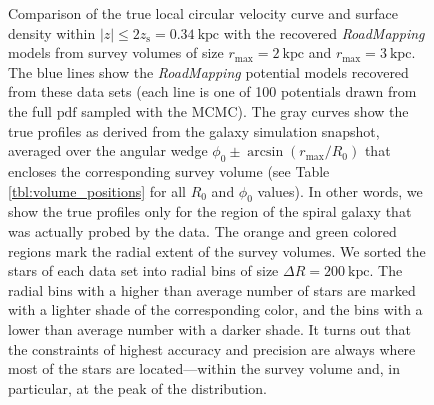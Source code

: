 \documentclass[iop,revtex4,numberedappendix,appendixfloats]{emulateapj}
\newcommand{\RM}{{\sl RoadMapping}}
\begin{document}
\begin{figure}[!htbp]
\centering
\caption{Comparison of the true local circular velocity curve and surface density within $|z| \leq 2 z_\text{s} = 0.34~\text{kpc}$ with the recovered \RM{} models from survey volumes of size $r_\text{max}=2~\text{kpc}$ and $r_\text{max}=3~\text{kpc}$. The blue lines show the \RM{} potential models recovered from these data sets (each line is one of 100 potentials drawn from the full $\text{pdf}$ sampled with the MCMC). The gray curves show the true profiles as derived from the galaxy simulation snapshot, averaged over the angular wedge $\phi_0\pm\arcsin(r_\text{max}/R_0)$ that encloses the corresponding survey volume (see Table \ref{tbl:volume_positions} for all $R_0$ and $\phi_0$ values). In other words, we show the true profiles only for the region of the spiral galaxy that was actually probed by the data. The orange and green colored regions mark the radial extent of the survey volumes. We sorted the stars of each data set into radial bins of size $\Delta R = 200~\text{kpc}$. The radial bins with a higher than average number of stars are marked with a lighter shade of the corresponding color, and the bins with a lower than average number with a darker shade. It turns out that the constraints of highest accuracy and precision are always where most of the stars are located---within the survey volume and, in particular, at the peak of the distribution.}
    \label{fig:vcirc_surfdens_suite_medium}
\end{figure}
\end{document}

